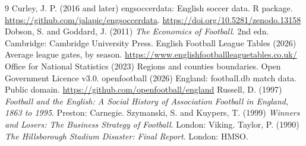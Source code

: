 \documentclass[11pt,a4paper]{article}
\begin{document}
\begin{thebibliography}{9}
 Curley, J. P. (2016 and later) engsoccerdata: English soccer data. R package. \url{https://github.com/jalapic/engsoccerdata}. \url{https://doi.org/10.5281/zenodo.13158}
 Dobson, S. and Goddard, J. (2011) \emph{The Economics of Football}. 2nd edn. Cambridge: Cambridge University Press.
 English Football League Tables (2026) Average league gates, by season. \url{https://www.englishfootballleaguetables.co.uk/}
 Office for National Statistics (2023) Regions and counties boundaries. Open Government Licence v3.0.
 openfootball (2026) England: football.db match data. Public domain. \url{https://github.com/openfootball/england}
 Russell, D. (1997) \emph{Football and the English: A Social History of Association Football in England, 1863 to 1995}. Preston: Carnegie.
 Szymanski, S. and Kuypers, T. (1999) \emph{Winners and Losers: The Business Strategy of Football}. London: Viking.
 Taylor, P. (1990) \emph{The Hillsborough Stadium Disaster: Final Report}. London: HMSO.
\end{thebibliography}
\end{document}

